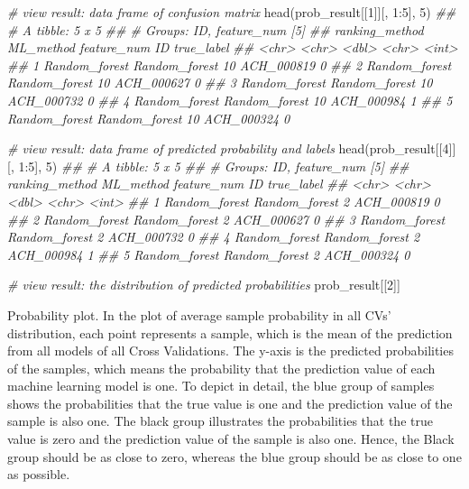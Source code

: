 \documentclass[]{article}
\newcommand{\hlnum}[1]{\textcolor[rgb]{0.816,0.125,0.439}{#1}}%
\newcommand{\hlcom}[1]{\textcolor[rgb]{0.502,0.502,0.502}{\textit{#1}}}%
\newcommand{\hlopt}[1]{\textcolor[rgb]{0,0,0}{#1}}%
\newcommand{\hlstd}[1]{\textcolor[rgb]{0.251,0.251,0.251}{#1}}%
\newcommand{\hlkwd}[1]{\textcolor[rgb]{0.878,0.439,0.125}{#1}}%
\newenvironment{Shaded}{\begin{myshaded}}{\end{myshaded}}
\newcommand{\KeywordTok}[1]{\hlkwd{#1}}
\newcommand{\DecValTok}[1]{\hlnum{#1}}
\newcommand{\CommentTok}[1]{\hlcom{#1}}
\newcommand{\OperatorTok}[1]{\hlopt{#1}}
\newcommand{\NormalTok}[1]{\hlstd{#1}}
\begin{document}
\begin{Shaded}
\begin{Highlighting}[]
\CommentTok{# view result: data frame of confusion matrix}
\KeywordTok{head}\NormalTok{(prob_result[[}\DecValTok{1}\NormalTok{]][, }\DecValTok{1}\OperatorTok{:}\DecValTok{5}\NormalTok{], }\DecValTok{5}\NormalTok{)}
\CommentTok{## # A tibble: 5 x 5}
\CommentTok{## # Groups:   ID, feature_num [5]}
\CommentTok{##   ranking_method ML_method     feature_num ID         true_label}
\CommentTok{##   <chr>          <chr>               <dbl> <chr>           <int>}
\CommentTok{## 1 Random_forest  Random_forest          10 ACH_000819          0}
\CommentTok{## 2 Random_forest  Random_forest          10 ACH_000627          0}
\CommentTok{## 3 Random_forest  Random_forest          10 ACH_000732          0}
\CommentTok{## 4 Random_forest  Random_forest          10 ACH_000984          1}
\CommentTok{## 5 Random_forest  Random_forest          10 ACH_000324          0}

\CommentTok{# view result: data frame of predicted probability and labels}
\KeywordTok{head}\NormalTok{(prob_result[[}\DecValTok{4}\NormalTok{]][, }\DecValTok{1}\OperatorTok{:}\DecValTok{5}\NormalTok{], }\DecValTok{5}\NormalTok{)}
\CommentTok{## # A tibble: 5 x 5}
\CommentTok{## # Groups:   ID, feature_num [5]}
\CommentTok{##   ranking_method ML_method     feature_num ID         true_label}
\CommentTok{##   <chr>          <chr>               <dbl> <chr>           <int>}
\CommentTok{## 1 Random_forest  Random_forest           2 ACH_000819          0}
\CommentTok{## 2 Random_forest  Random_forest           2 ACH_000627          0}
\CommentTok{## 3 Random_forest  Random_forest           2 ACH_000732          0}
\CommentTok{## 4 Random_forest  Random_forest           2 ACH_000984          1}
\CommentTok{## 5 Random_forest  Random_forest           2 ACH_000324          0}
\end{Highlighting}
\end{Shaded}

\begin{Shaded}
\begin{Highlighting}[]
\CommentTok{# view result: the distribution of predicted probabilities}
\NormalTok{prob_result[[}\DecValTok{2}\NormalTok{]]}
\end{Highlighting}
\end{Shaded}

\label{fig:unnamed-chunk-60}Probability plot. In the plot of average sample probability in all CVs' distribution, each point represents a sample, which is the mean of the prediction from all models of all Cross Validations. The y-axis is the predicted probabilities of the samples, which means the probability that the prediction value of each machine learning model is one. To depict in detail, the blue group of samples shows the probabilities that the true value is one and the prediction value of the sample is also one. The black group illustrates the probabilities that the true value is zero and the prediction value of the sample is also one. Hence, the Black group should be as close to zero, whereas the blue group should be as close to one as possible.
\end{document}
